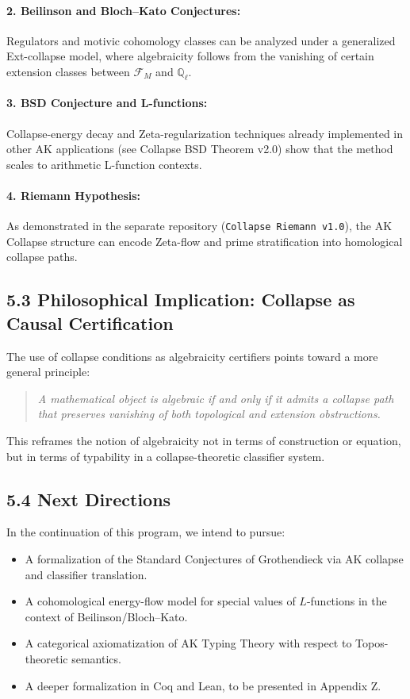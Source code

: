 \documentclass[11pt]{article}
\begin{document}
\paragraph{2. Beilinson and Bloch–Kato Conjectures:}
Regulators and motivic cohomology classes can be analyzed under a generalized Ext-collapse model, where algebraicity follows from the vanishing of certain extension classes between $\mathcal{F}_M$ and $\mathbb{Q}_\ell$.

\paragraph{3. BSD Conjecture and L-functions:}
Collapse-energy decay and Zeta-regularization techniques already implemented in other AK applications (see Collapse BSD Theorem v2.0) show that the method scales to arithmetic L-function contexts.

\paragraph{4. Riemann Hypothesis:}
As demonstrated in the separate repository (\texttt{Collapse Riemann v1.0}), the AK Collapse structure can encode Zeta-flow and prime stratification into homological collapse paths.

\subsection{5.3 Philosophical Implication: Collapse as Causal Certification}

The use of collapse conditions as algebraicity certifiers points toward a more general principle:

\begin{quote}
\emph{A mathematical object is algebraic if and only if it admits a collapse path that preserves vanishing of both topological and extension obstructions.}
\end{quote}

This reframes the notion of algebraicity not in terms of construction or equation, but in terms of typability in a collapse-theoretic classifier system.

\subsection{5.4 Next Directions}

In the continuation of this program, we intend to pursue:

\begin{itemize}
  \item A formalization of the Standard Conjectures of Grothendieck via AK collapse and classifier translation.
  \item A cohomological energy-flow model for special values of $L$-functions in the context of Beilinson/Bloch–Kato.
  \item A categorical axiomatization of AK Typing Theory with respect to Topos-theoretic semantics.
  \item A deeper formalization in Coq and Lean, to be presented in Appendix Z.
\end{itemize}
\end{document}
